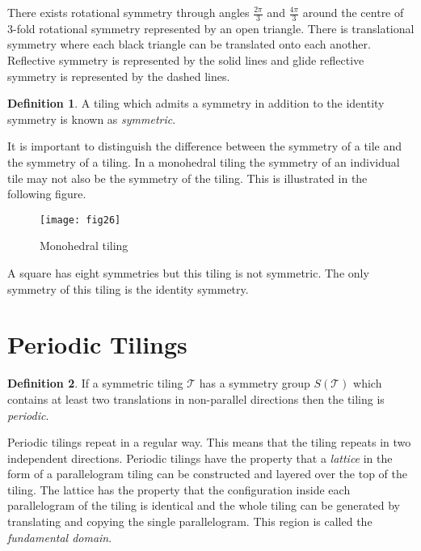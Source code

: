 \documentclass[a4paper,12pt,twoside,abstraction,titlepage]{article}
\theoremstyle{remark}
\theoremstyle{definition}
\newtheorem{definition}{Definition}[section]
\begin{document}
\noindent There exists rotational symmetry through angles $\frac{2\pi}{3}$ and $\frac{4\pi}{3}$ around the centre of 3-fold rotational symmetry represented by an open triangle. There is translational symmetry where each black triangle can be translated onto each another. Reflective symmetry is represented by the solid lines and glide reflective symmetry is represented by the dashed lines.

\begin{definition}
A tiling which admits a symmetry in addition to the identity symmetry is known as \emph{symmetric}.~\cite[\S 1.3]{branko}
\end{definition} 

It is important to distinguish the difference between the symmetry of a tile and the symmetry of a tiling. In a monohedral tiling the symmetry of an individual tile may not also be the symmetry of the tiling. This is illustrated in the following figure.\\

\begin{figure}[h]
\begin{center}
\texttt{[image: fig26]}
\caption{Monohedral tiling\label{mono}~\cite{cornell}}
\vspace{-15pt}
\end{center}
\end{figure}

\noindent A square has eight symmetries but this tiling is not symmetric. The only symmetry of this tiling is the identity symmetry.~\cite[\S 1.3]{branko}

\newpage
\section{Periodic Tilings}
\begin{definition}
If a symmetric tiling $\mathscr{T}$ has a symmetry group $S(\mathscr{T})$ which contains at least two translations in non-parallel directions then the tiling is \emph{periodic}.~\cite[\S 1.3]{branko}
\end{definition} 

\noindent Periodic tilings repeat in a regular way. This means that the tiling repeats in two independent directions. Periodic tilings have the property that a \emph{lattice} in the form of a parallelogram tiling can be constructed and layered over the top of the tiling. The lattice has the property that the configuration inside each parallelogram of the tiling is identical and the whole tiling can be generated by translating and copying the single parallelogram. This region is called the \emph{fundamental domain}. 
\end{document}

